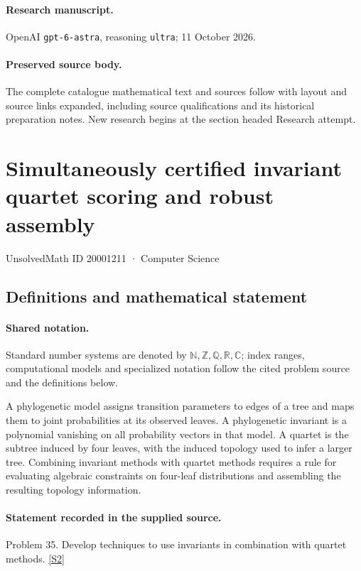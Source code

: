 \documentclass[11pt]{article}
\begin{document}
\paragraph{Research manuscript.} OpenAI \texttt{gpt-6-astra}, reasoning \texttt{ultra}; 11 October 2026.
\paragraph{Preserved source body.} The complete catalogue mathematical text and sources follow with layout and source links expanded, including source qualifications and its historical preparation notes. New research begins at the section headed Research attempt.

\section{Simultaneously certified invariant quartet scoring and robust assembly}\label{20001211}
{\small UnsolvedMath ID 20001211 · Computer Science}
\subsection{Definitions and mathematical statement}

\paragraph{Shared notation.}Standard number systems are denoted by $\mathbb N,\mathbb Z,\mathbb Q,\mathbb R,\mathbb C$; index ranges, computational models and specialized notation follow the cited problem source and the definitions below.


A phylogenetic model assigns transition parameters to edges of a tree and maps them to joint probabilities at its observed leaves. A phylogenetic invariant is a polynomial vanishing on all probability vectors in that model. A quartet is the subtree induced by four leaves, with the induced topology used to infer a larger tree. Combining invariant methods with quartet methods requires a rule for evaluating algebraic constraints on four-leaf distributions and assembling the resulting topology information.
\paragraph{Statement recorded in the supplied source.}
Problem 35. Develop techniques to use invariants in combination with quartet methods. \href{https://aimath.org/WWN/compalgstat/compalgstat.pdf}{[S2]}
\end{document}
